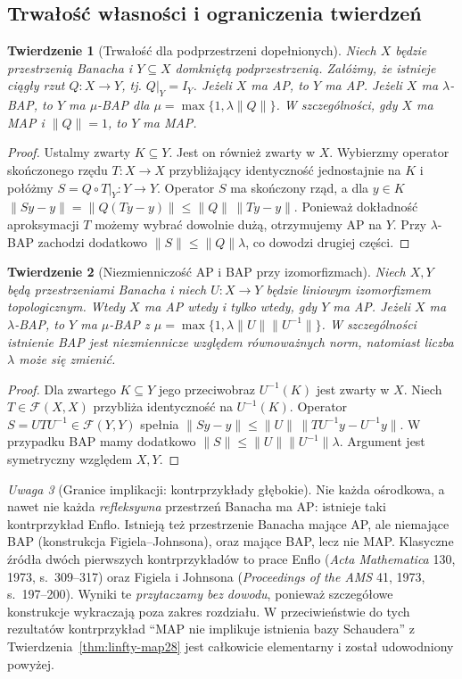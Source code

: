 \documentclass[11pt,a4paper]{article}
\numberwithin{equation}{section}
\theoremstyle{plain}
\newtheorem{twierdzenie}{Twierdzenie}[section]
\theoremstyle{definition}
\theoremstyle{remark}
\newtheorem{uwaga}[twierdzenie]{Uwaga}
\begin{document}
\subsection{Trwałość własności i ograniczenia twierdzeń}

\begin{twierdzenie}[Trwałość dla podprzestrzeni dopełnionych]
\label{thm:complemented28}
Niech $X$ będzie przestrzenią Banacha i $Y\subseteq X$
domkniętą podprzestrzenią. Załóżmy, że istnieje
ciągły rzut $Q:X\to Y$, tj. $Q|_Y=I_Y$.
Jeżeli $X$ ma AP, to $Y$ ma AP.
Jeżeli $X$ ma $\lambda$-BAP, to $Y$ ma
$\mu$-BAP dla $\mu=\max\{1,\lambda\|Q\|\}$.
W szczególności, gdy $X$ ma MAP i $\|Q\|=1$,
to $Y$ ma MAP.
\end{twierdzenie}
\begin{proof}
Ustalmy zwarty $K\subseteq Y$. Jest on również
zwarty w $X$. Wybierzmy operator skończonego rzędu
$T:X\to X$ przybliżający identyczność jednostajnie
na $K$ i połóżmy $S=Q\circ T|_Y:Y\to Y$.
Operator $S$ ma skończony rząd, a dla $y\in K$
$\|Sy-y\|=\|Q(Ty-y)\|\le\|Q\|\,\|Ty-y\|$.
Ponieważ dokładność aproksymacji $T$ możemy wybrać
dowolnie dużą, otrzymujemy AP na $Y$.
Przy $\lambda$-BAP zachodzi dodatkowo
$\|S\|\le\|Q\|\lambda$, co dowodzi drugiej części.
\end{proof}

\begin{twierdzenie}[Niezmienniczość AP i BAP przy izomorfizmach]
\label{thm:isomorphic28}
Niech $X,Y$ będą przestrzeniami Banacha i niech
$U:X\to Y$ będzie liniowym izomorfizmem topologicznym.
Wtedy $X$ ma AP wtedy i tylko wtedy, gdy $Y$ ma AP.
Jeżeli $X$ ma $\lambda$-BAP, to $Y$ ma
$\mu$-BAP z $\mu=\max\{1,\lambda\|U\|\|U^{-1}\|\}$.
W szczególności istnienie BAP jest niezmiennicze
względem równoważnych norm, natomiast liczba $\lambda$
może się zmienić.
\end{twierdzenie}
\begin{proof}
Dla zwartego $K\subseteq Y$ jego przeciwobraz
$U^{-1}(K)$ jest zwarty w $X$. Niech
$T\in\mathcal F(X,X)$ przybliża identyczność na
$U^{-1}(K)$. Operator $S=UTU^{-1}\in\mathcal F(Y,Y)$
spełnia $\|Sy-y\|\le\|U\|\,\|TU^{-1}y-U^{-1}y\|$.
W przypadku BAP mamy dodatkowo
$\|S\|\le\|U\|\|U^{-1}\|\lambda$.
Argument jest symetryczny względem $X,Y$.
\end{proof}

\begin{uwaga}[Granice implikacji: kontrprzykłady głębokie]
\label{rem:enflo-figiel28}
Nie każda ośrodkowa, a nawet nie każda \emph{refleksywna}
przestrzeń Banacha ma AP: istnieje taki kontrprzykład
Enflo. Istnieją też przestrzenie Banacha mające AP,
ale niemające BAP (konstrukcja Figiela--Johnsona),
oraz mające BAP, lecz nie MAP. Klasyczne źródła
dwóch pierwszych kontrprzykładów to prace Enflo
(\emph{Acta Mathematica} 130, 1973, s.~309--317) oraz
Figiela i Johnsona (\emph{Proceedings of the AMS} 41,
1973, s.~197--200). Wyniki te \emph{przytaczamy bez dowodu}, ponieważ szczegółowe
konstrukcje wykraczają poza zakres rozdziału.
W przeciwieństwie do tych rezultatów kontrprzykład
``MAP nie implikuje istnienia bazy Schaudera'' z
Twierdzenia~\ref{thm:linfty-map28} jest całkowicie
elementarny i został udowodniony powyżej.
\end{uwaga}
\end{document}
